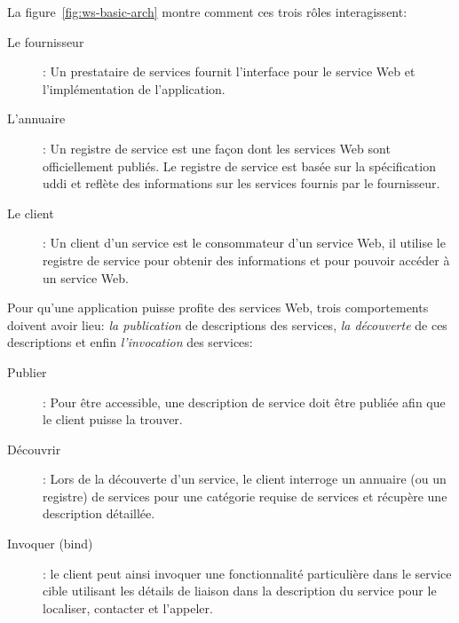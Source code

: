   

  La figure~\ref{fig:ws-basic-arch} montre comment ces trois rôles
  interagissent:

  \renewcommand{\descriptionlabel}[1]{\hspace{0.5cm}\textbullet~\textsf{#1}}
  \begin{description}
  \item[Le fournisseur]: Un prestataire de services fournit
    l'interface pour le service Web et l'implémentation de
    l'application.

  \item[L'annuaire]: Un registre de service est une façon dont les
    services Web sont officiellement publiés. Le registre de service
    est basée sur la spécification \acrshort{uddi} et reflète des
    informations sur les services fournis par le fournisseur.

  \item[Le client]: Un client d'un service est le consommateur d'un
    service Web, il utilise le registre de service pour obtenir des
    informations et pour pouvoir accéder à un service Web.
  \end{description}
  \enddescription

  Pour qu'une application puisse profite des services Web, trois
  comportements doivent avoir lieu: \textit{la publication} de
  descriptions des services, \textit{la découverte} de ces
  descriptions et enfin \textit{l'invocation} des services:

  \renewcommand{\descriptionlabel}[1]{\hspace{0.5cm}\textbullet~\textsf{#1}}
  \begin{description}
  \item[Publier]: Pour être accessible, une description de service
    doit être publiée afin que le client puisse la trouver.

  \item[Découvrir]: Lors de la découverte d'un service, le client
    interroge un annuaire (ou un registre) de services pour une
    catégorie requise de services et récupère une description
    détaillée.

  \item[Invoquer (bind)]: le client peut ainsi invoquer une
    fonctionnalité particulière dans le service cible utilisant les
    détails de liaison dans la description du service pour le
    localiser, contacter et l'appeler.
  \end{description}
  \enddescription

